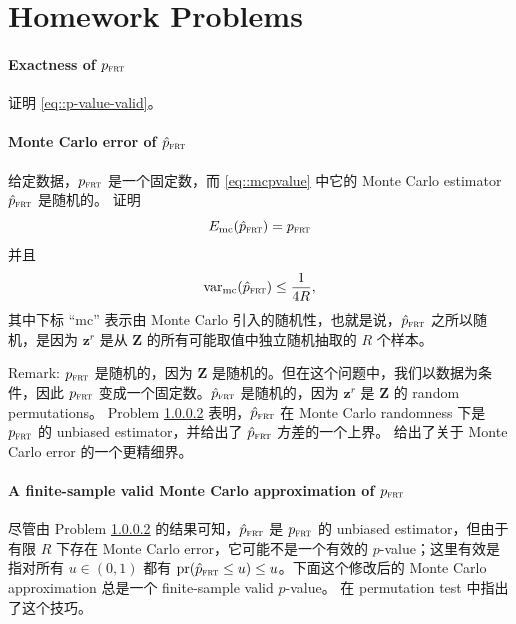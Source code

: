 \section{Homework Problems}



\paragraph{Exactness of $p_{\textsc{frt}}$}
\label{hw::exact-frt}

证明 \eqref{eq::p-value-valid}。



\paragraph{Monte Carlo error of $\hat p_{\textsc{frt}}$ }\label{para::monte-carlo-error-pfrt}

给定数据，$p_{\textsc{frt}}$ 是一个固定数，而 \eqref{eq::mcpvalue} 中它的 Monte Carlo estimator $\hat p_{\textsc{frt}}$ 是随机的。
证明
$$
E_{\text{mc}} (\hat p_{\textsc{frt}}) =   p_{\textsc{frt}}
$$
并且
$$
\textup{var}_{\text{mc}} (\hat p_{\textsc{frt}})  \leq \frac{1}{4R},
$$
其中下标 ``mc'' 表示由 Monte Carlo 引入的随机性，也就是说，$\hat p_{\textsc{frt}}$ 之所以随机，是因为 $\boldsymbol{z}^r$ 是从 $\boldsymbol{Z}$ 的所有可能取值中独立随机抽取的 $R$ 个样本。


Remark: $p_{\textsc{frt}}$ 是随机的，因为 $\boldsymbol{Z}$ 是随机的。但在这个问题中，我们以数据为条件，因此 $p_{\textsc{frt}}$ 变成一个固定数。$\hat p_{\textsc{frt}}$ 是随机的，因为 $\boldsymbol{z}^r$ 是 $\boldsymbol{Z}$ 的 random permutations。
Problem \ref{para::monte-carlo-error-pfrt} 表明，$\hat p_{\textsc{frt}}$ 在 Monte Carlo randomness 下是 $p_{\textsc{frt}}$ 的 unbiased estimator，并给出了 $\hat p_{\textsc{frt}}$ 方差的一个上界。\citet[][Theorem 2]{luo2021leveraging} 给出了关于 Monte Carlo error 的一个更精细界。




\paragraph{A finite-sample valid Monte Carlo approximation of $p_{\textsc{frt}}$ }\label{para::finite-sample-exact-monte-carlo-frt}


尽管由 Problem \ref{para::monte-carlo-error-pfrt} 的结果可知，$\hat p_{\textsc{frt}}$ 是 $p_{\textsc{frt}}$ 的 unbiased estimator，但由于有限 $R$ 下存在 Monte Carlo error，它可能不是一个有效的 $p$-value；这里有效是指对所有 $u\in (0,1)$ 都有 $\textup{pr}(\hat p_{\textsc{frt}} \leq u) \leq u$。下面这个修改后的 Monte Carlo approximation 总是一个 finite-sample valid $p$-value。\citet{phipson2010permutation} 在 permutation test 中指出了这个技巧。



